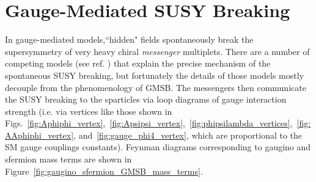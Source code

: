\documentclass[dissertation.tex]{subfiles}
\begin{document}
\section{Gauge-Mediated SUSY Breaking}
\label{sec:Gauge-Mediated SUSY Breaking}

In gauge-mediated models\cite{GMSB},``hidden" fields spontaneously break the supersymmetry of very heavy chiral \textit{messenger} multiplets.  There are a number of competing models (see ref. \cite{GMSB}) that explain the precise mechanism of the spontaneous SUSY breaking, but fortunately the details of those models mostly decouple from the phenomenology of GMSB.  The messengers then communicate the SUSY breaking to the sparticles via loop diagrams of gauge interaction strength (i.e. via vertices like those shown in Figs.~\ref{fig:Aphiphi_vertex},~\ref{fig:Apsipsi_vertex},~\ref{fig:phipsilambda_vertices},~\ref{fig:AAphiphi_vertex}, and~\ref{fig:gauge_phi4_vertex}, which are proportional to the SM gauge couplings constants).  Feynman diagrams corresponding to gaugino and sfermion mass terms are shown in Figure~\ref{fig:gaugino_sfermion_GMSB_mass_terms}.
\end{document}
